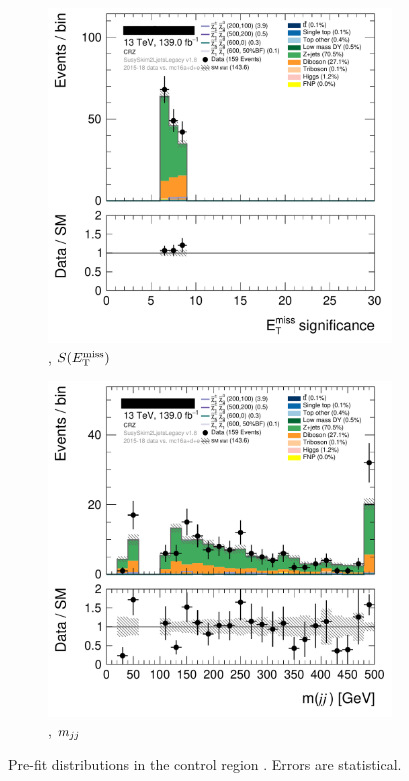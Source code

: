 \begin{figure}[tp]
\centering
\begin{subfigure}{0.48\textwidth}
\centering
\includegraphics[width=\textwidth]{figures/2ljets_def_met_Sign_CRZ.png}
\caption{\crz, $S(E_\mathrm{T}^\mathrm{miss})$}
\end{subfigure}
\hfill
\begin{subfigure}{0.48\textwidth}
\centering
\includegraphics[width=\textwidth]{figures/2ljets_def_mjj_CRZ.png}
\caption{\crz, $m_{jj}$}
\end{subfigure}
\caption[
Pre-fit distributions in the control region CR-Z
]{%
Pre-fit distributions in the control region \crz.
Errors are statistical.
}
\label{fig:2ljets_low_cr_region}
\end{figure}


